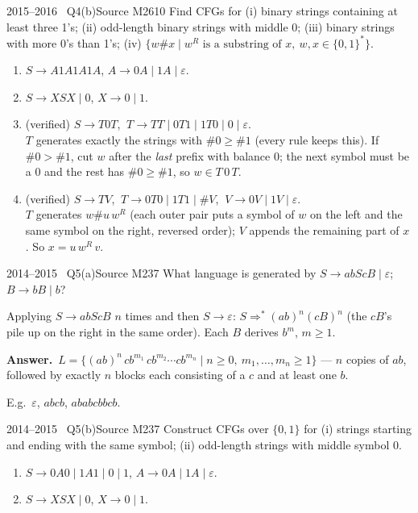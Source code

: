 \documentclass[11pt,a4paper]{article}
\newcommand{\eps}{\varepsilon}
\newcommand{\ans}[1]{\par\smallskip\noindent\colorbox{mist}{\parbox{\dimexpr\linewidth-2\fboxsep}{\sffamily\small\textbf{\color{teal}Answer.}\ \color{ink}#1}}\par}
\begin{document}
\begin{question}{2015--2016 \textbullet\ Q4(b)}{Source M26}{10}
Find CFGs for (i) binary strings containing at least three 1's; (ii) odd-length binary strings with middle 0; (iii) binary strings with more 0's than 1's; (iv) $\{w\#x\mid w^R \text{ is a substring of } x,\ w,x\in\{0,1\}^*\}$.
\end{question}
\begin{solution}
\begin{enumerate}
\item $S\to A1A1A1A$, $A\to0A\mid1A\mid\eps$.
\item $S\to XSX\mid0$, $X\to0\mid1$.
\item (verified) $S\to T0T$, $\ T\to TT\mid0T1\mid1T0\mid0\mid\eps$. \\
$T$ generates exactly the strings with $\#0\ge\#1$ (every rule keeps this). If $\#0>\#1$, cut $w$ after the \emph{last} prefix with balance 0; the next symbol must be a 0 and the rest has $\#0\ge\#1$, so $w\in T\,0\,T$.
\item (verified) $S\to TV$, $\ T\to0T0\mid1T1\mid\#V$, $\ V\to0V\mid1V\mid\eps$. \\
$T$ generates $w\#u\,w^R$ (each outer pair puts a symbol of $w$ on the left and the same symbol on the right, reversed order); $V$ appends the remaining part of $x$. So $x=u\,w^R\,v$.
\end{enumerate}
\end{solution}

\begin{question}{2014--2015 \textbullet\ Q5(a)}{Source M23}{7}
What language is generated by $S\to abScB\mid\eps$; $B\to bB\mid b$?
\end{question}
\begin{solution}
Applying $S\to abScB$ $n$ times and then $S\to\eps$: $S\Rightarrow^*(ab)^n(cB)^n$ (the $cB$'s pile up on the right in the same order). Each $B$ derives $b^m$, $m\ge1$.
\ans{$L=\{(ab)^n\,cb^{m_1}\,cb^{m_2}\cdots cb^{m_n}\mid n\ge0,\ m_1,\dots,m_n\ge1\}$ --- $n$ copies of $ab$, followed by exactly $n$ blocks each consisting of a $c$ and at least one $b$.}
E.g.\ $\eps$, $abcb$, $ababcbbcb$.
\end{solution}

\begin{question}{2014--2015 \textbullet\ Q5(b)}{Source M23}{7}
Construct CFGs over $\{0,1\}$ for (i) strings starting and ending with the same symbol; (ii) odd-length strings with middle symbol 0.
\end{question}
\begin{solution}
\begin{enumerate}
\item $S\to0A0\mid1A1\mid0\mid1$, $A\to0A\mid1A\mid\eps$.
\item $S\to XSX\mid0$, $X\to0\mid1$.
\end{enumerate}
\end{solution}
\end{document}
